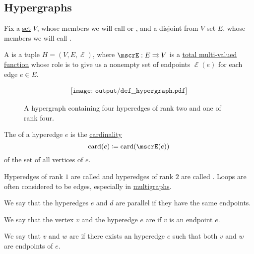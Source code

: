 \subsection{Hypergraphs}\label{subsec:hypergraphs}

\begin{definition}\label{def:hypergraph}
  Fix a \hyperref[def:set]{set} \( V \), whose members we will call  or , and a disjoint from \( V \) set \( E \), whose members we will call .

  A  is a tuple \( H = (V, E, \mscrE) \), where \( \mscrE: E \multto V \) is a \hyperref[def:multi_valued_function/total]{total multi-valued function} whose role is to give us a nonempty set of endpoints \( \mscrE(e) \) for each edge \( e \in E \).

  \begin{figure}[h]
    \begin{equation}\label{eq:fig:def:hypergraph}
      \begin{aligned}
        \texttt{[image: output/def\_\_hypergraph.pdf]}
      \end{aligned}
    \end{equation}
    \caption{A hypergraph containing four hyperedges of rank two and one of rank four.}\label{fig:def:hypergraph}
  \end{figure}

  \begin{thmenum}
     The  of a hyperedge \( e \) is the \hyperref[thm:cardinality_existence]{cardinality}
    \begin{equation*}
      \card(e) \coloneqq \card(\mscrE(e))
    \end{equation*}
    of the set of all vertices of \( e \).

    Hyperedges of rank \( 1 \) are called  and hyperedges of rank \( 2 \) are called . Loops are often considered to be edges, especially in \hyperref[def:undirected_multigraph]{multigraphs}.

     We say that the hyperedges \( e \) and \( d \) are parallel if they have the same endpoints.

     We say that the vertex \( v \) and the hyperedge \( e \) are  if \( v \) is an endpoint \( e \).

     We say that \( v \) and \( w \) are  if there exists an hyperedge \( e \) such that both \( v \) and \( w \) are endpoints of \( e \).


\end{thmenum}
\end{definition}
